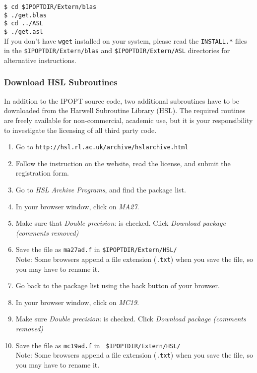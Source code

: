 \documentclass[letter,10pt]{article}
\begin{document}
\noindent
{\tt \$ cd \$IPOPTDIR/Extern/blas}\\
{\tt \$ ./get.blas}\\
{\tt \$ cd ../ASL}\\
{\tt \$ ./get.asl}\\

\noindent
If you don't have \texttt{wget} installed on your system, please read
the \texttt{INSTALL.*} files in the \texttt{\$IPOPTDIR/Extern/blas}
and \texttt{\$IPOPTDIR/Extern/ASL} directories for alternative
instructions.

\subsubsection{Download HSL Subroutines}
In addition to the IPOPT source code, two additional subroutines have
to be downloaded from the Harwell Subroutine Library (HSL).  The
required routines are freely available for non-commercial, academic
use, but it is your responsibility to investigate the licensing of all
third party code.
\begin{enumerate}
\item Go to {\tt http://hsl.rl.ac.uk/archive/hslarchive.html}
\item Follow the instruction on the website, read the license, and
  submit the registration form.
\item Go to \textit{HSL Archive Programs}, and find the package list.
\item In your browser window, click on \textit{MA27}.
\item Make sure that \textit{Double precision:} is checked. 
  Click \textit{Download package (comments removed)}
\item Save the file as {\tt ma27ad.f} in {\tt \$IPOPTDIR/Extern/HSL/}\\
  Note: Some browsers append a file extension ({\tt .txt}) when you save
  the file, so you may have to rename it.
\item Go back to the package list using the back button of your browser.
\item In your browser window, click on \textit{MC19}.
\item Make sure \textit{Double precision:} is checked. Click 
  \textit{Download package (comments removed)}
\item Save the file as {\tt mc19ad.f} in {\tt
    \$IPOPTDIR/Extern/HSL/}\\
  Note: Some browsers append a file extension ({\tt .txt}) when you save
  the file, so you may have to rename it.
\end{enumerate}
\end{document}
